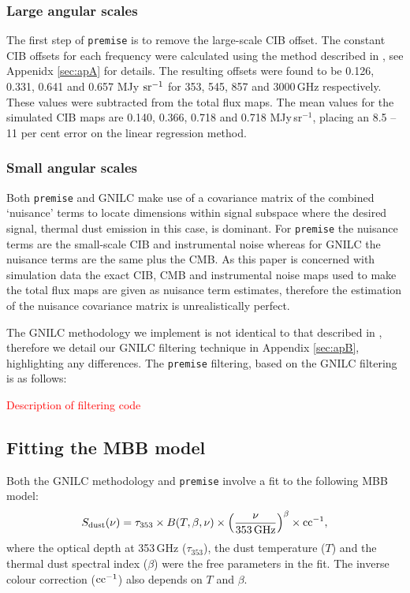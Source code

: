 \documentclass[a4paper,fleqn,usenatbib]{mnras}
\begin{document}
\subsubsection{Large angular scales}

The first step of {\texttt{premise}} is to remove the large-scale CIB offset. The constant CIB offsets for each frequency were calculated using the method described in \citet{pr2}, see Appenidx \ref{sec:apA} for details. The resulting offsets were found to be 0.126, 0.331, 0.641 and 0.657 MJy $\rm{sr^{-1}}$ for 353, 545, 857 and 3000\,GHz respectively.  These values were subtracted from the total flux maps. The mean values for the simulated CIB maps are 0.140, 0.366, 0.718 and 0.718 MJy\,sr$^{-1}$, placing an 8.5 -- 11 per cent error on the linear regression method.

\subsubsection{Small angular scales}

Both {\texttt{premise}} and GNILC make use of a covariance matrix of the combined `nuisance' terms to locate dimensions within signal subspace where the desired signal, thermal dust emission in this case, is dominant. For {\texttt{premise}} the nuisance terms are the small-scale CIB and instrumental noise whereas for GNILC the nuisance terms are the same plus the CMB. As this paper is concerned with simulation data the exact CIB, CMB and instrumental noise maps used to make the total flux maps are given as nuisance term estimates, therefore the estimation of the nuisance covariance matrix is unrealistically perfect. 

The GNILC methodology we implement is not identical to that described in \citet{gnilc}, therefore we detail our GNILC filtering technique in Appendix \ref{sec:apB}, highlighting any differences. The {\texttt{premise}} filtering, based on the GNILC filtering is as follows: 

\textcolor{red}{Description of filtering code}

\subsection{Fitting the MBB model}

Both the GNILC methodology and {\texttt{premise}} involve a fit to the following MBB model:
\begin{equation}
S_{\rm{dust}}(\nu) = \tau_{353} \times B(T, \beta, \nu) \times \left(\frac{\nu}{353 \, \rm{GHz}}\right)^{\beta} \times \rm{cc}^{-1},
\end{equation}
where the optical depth at 353\,GHz ($\tau_{353}$), the dust temperature ($T$) and the thermal dust spectral index ($\beta$) were the free parameters in the fit. The inverse colour correction ($\rm{cc}^{-1}$) also depends on $T$ and $\beta$. 
\end{document}
